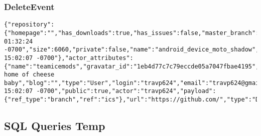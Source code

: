 \documentclass[a4paper,10pt]{article}
\begin{document}
\subsubsection{DeleteEvent}
\begin{lstlisting}
{"repository":{"homepage":"","has_downloads":true,"has_issues":false,"master_branch":"master","forks":0,"language":"Shell","fork":true,"has_wiki":true,"url":"https://github.com/travp624/android_device_moto_shadow","created_at":"2012/04/03 01:32:24 -0700","size":6060,"private":false,"name":"android_device_moto_shadow","description":"","owner":"travp624","open_issues":0,"watchers":1,"pushed_at":"2012/04/11 15:02:07 -0700"},"actor_attributes":{"name":"teamicemods","gravatar_id":"1eb4d77c7c79eccde05a7047fbae4195","location":"wisconsin home of cheese baby","blog":"","type":"User","login":"travp624","email":"travp624@gmail.com"},"created_at":"2012/04/11 15:02:07 -0700","public":true,"actor":"travp624","payload":{"ref_type":"branch","ref":"ics"},"url":"https://github.com/","type":"DeleteEvent"}
\end{lstlisting}


\subsection{SQL Queries Temp}
\end{document}
